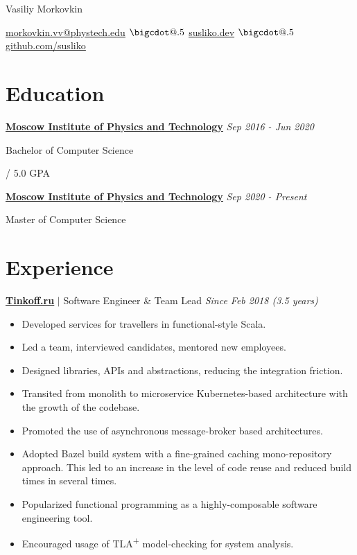 \documentclass[paper=a4,fontsize=15pt]{scrartcl}
\makeatletter
\newcommand*\bigcdot{\mathpalette\bigcdot@{.5}}
\newcommand*\bigcdot@[2]{\mathbin{\vcenter{\hbox{\scalebox{#2}{$\m@th#1\bullet$}}}}}
\newcommand{\smallspace}{\vspace*{0.1em}}
\newcommand{\quarterspace}{\vspace*{0.25em}}
\newcommand{\halfspace}{\vspace*{0.5em}}
\newcommand{\https}[1]{\href{https://#1}{\ul{#1}}}
\newcommand{\email}[1]{\href{mailto:#1}{\ul{#1}}}
\makeatother
\begin{document}
\begin{center}
  {\fontsize{35}{40}\selectfont Vasiliy Morkovkin \par}
  \halfspace
  \smallspace
  \smallspace

  {\normalsize
    \email{morkovkin.vv@phystech.edu}
    $\bigcdot$ \https{susliko.dev}
    $\bigcdot$ \https{github.com/susliko}
    \par}
\end{center}

\section*{Education}{}
\noindent \href{https://mipt.ru/english/}{\textbf{\ul{Moscow Institute of Physics and Technology}}}
{\hfill \footnotesize \textit{Sep 2016 - Jun 2020}} \par
\noindent Bachelor of Computer Science \par
\quarterspace
\footnotesize
{} / 5.0 GPA

\normalsize
\noindent \href{https://mipt.ru/english/}{\textbf{\ul{Moscow Institute of Physics and Technology}}}
{\hfill \footnotesize \textit{Sep 2020 - Present}} \par
\noindent Master of Computer Science \par
\quarterspace
\footnotesize

\section*{Experience}{}
\normalsize
\noindent \href{https://www.tinkoff.ru}{\textbf{\ul{Tinkoff.ru}}}
$\vert$ \small Software Engineer \& Team Lead
{\hfill \footnotesize \textit{Since Feb 2018 (3.5 years)}}
\begin{itemize}[noitemsep,leftmargin=20pt,label=\raisebox{0.25ex}{\tiny$\bullet$},topsep=5pt]
  \small
  \item Developed services for travellers in functional-style Scala.
  \item Led a team, interviewed candidates, mentored new employees.
  \item Designed libraries, APIs and abstractions, reducing the integration friction.
  \item Transited from monolith to microservice Kubernetes-based architecture with the growth of the codebase.
  \item Promoted the use of asynchronous message-broker based architectures.
  \item Adopted Bazel build system with a fine-grained caching mono-repository approach. This led to an increase in the level of code reuse and reduced build times in several times.
  \item Popularized functional programming as a highly-composable software engineering tool.
  \item Encouraged usage of TLA\textsuperscript{+} model-checking for system analysis.
\end{itemize}
\end{document}
